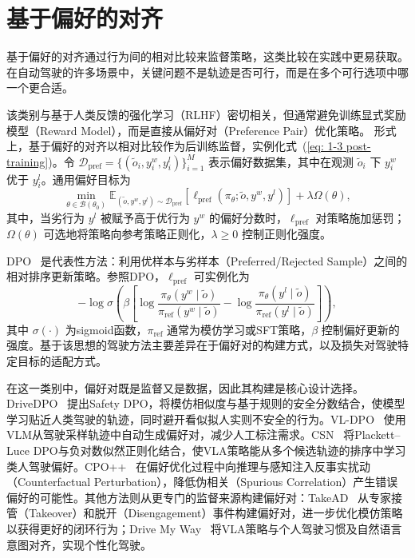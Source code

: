 \documentclass[runningheads]{llncs}
\begin{document}
\section{基于偏好的对齐}
\label{sec:preference}

基于偏好的对齐通过行为间的相对比较来监督策略，这类比较在实践中更易获取。在自动驾驶的许多场景中，关键问题不是轨迹是否可行，而是在多个可行选项中哪一个更合适。

该类别与基于人类反馈的强化学习（RLHF）密切相关，但通常避免训练显式奖励模型（Reward Model），而是直接从偏好对（Preference Pair）优化策略。
形式上，基于偏好的对齐以相对比较作为后训练监督，实例化式~(\ref{eq: 1-3 post-training})。令 $\mathcal{D}_{\mathrm{pref}}=\{(\tilde{o}_i,y_i^w,y_i^l)\}_{i=1}^{M}$ 表示偏好数据集，其中在观测 $\tilde{o}_i$ 下 $y_i^w$ 优于 $y_i^l$。通用偏好目标为
\begin{equation}
\min_{\theta \in \mathcal{B}(\theta_0)}
\mathbb{E}_{(\tilde{o},y^w,y^l)\sim \mathcal{D}_{\mathrm{pref}}}
\left[
\ell_{\mathrm{pref}}
\left(
\pi_\theta; \tilde{o}, y^w, y^l
\right)
\right]
+
\lambda\Omega(\theta),
\label{eq:preference_post_training}
\end{equation}
其中，当劣行为 $y^l$ 被赋予高于优行为 $y^w$ 的偏好分数时，$\ell_{\mathrm{pref}}$ 对策略施加惩罚；$\Omega(\theta)$ 可选地将策略向参考策略正则化，$\lambda\ge 0$ 控制正则化强度。

DPO~\cite{rafailov2023dpo} 是代表性方法：利用优样本与劣样本（Preferred/Rejected Sample）之间的相对排序更新策略。参照DPO，$\ell_{\mathrm{pref}}$ 可实例化为
\[
-\log \sigma
\left(
\beta
\left[
\log
\frac{\pi_\theta(y^w\mid\tilde{o})}
{\pi_{\mathrm{ref}}(y^w\mid\tilde{o})}
-
\log
\frac{\pi_\theta(y^l\mid\tilde{o})}
{\pi_{\mathrm{ref}}(y^l\mid\tilde{o})}
\right]
\right),
\]
其中 $\sigma(\cdot)$ 为sigmoid函数，$\pi_{\mathrm{ref}}$ 通常为模仿学习或SFT策略，$\beta$ 控制偏好更新的强度。基于该思想的驾驶方法主要差异在于偏好对的构建方式，以及损失对驾驶特定目标的适配方式。



在这一类别中，偏好对既是监督又是数据，因此其构建是核心设计选择。DriveDPO~\cite{drivedpo2025} 提出Safety DPO，将模仿相似度与基于规则的安全分数结合，使模型学习贴近人类驾驶的轨迹，同时避开看似拟人实则不安全的行为。VL-DPO~\cite{vldpo2026} 使用VLM从驾驶采样轨迹中自动生成偏好对，减少人工标注需求。CSN~\cite{csn2026} 将Plackett--Luce DPO与负对数似然正则化结合，使VLA策略能从多个候选轨迹的排序中学习类人驾驶偏好。CPO++~\cite{cpopp2026} 在偏好优化过程中向推理与感知注入反事实扰动（Counterfactual Perturbation），降低伪相关（Spurious Correlation）产生错误偏好的可能性。其他方法则从更专门的监督来源构建偏好对：TakeAD~\cite{takead2025} 从专家接管（Takeover）和脱开（Disengagement）事件构建偏好对，进一步优化模仿策略以获得更好的闭环行为；Drive My Way~\cite{drivemyway2026} 将VLA策略与个人驾驶习惯及自然语言意图对齐，实现个性化驾驶。
\end{document}
